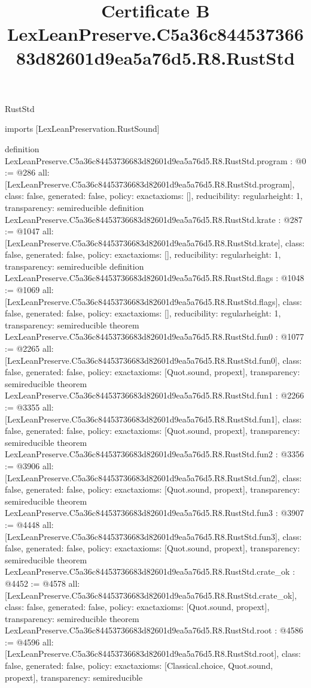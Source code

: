 \begin{lexlean}{RustStd}
\title{Certificate B LexLeanPreserve.C5a36c84453736683d82601d9ea5a76d5.R8.RustStd}
\begin{coremodule}
imports [LexLeanPreservation.RustSound]

definition LexLeanPreserve.C5a36c84453736683d82601d9ea5a76d5.R8.RustStd.program : @0 := @286 {
  all: [LexLeanPreserve.C5a36c84453736683d82601d9ea5a76d5.R8.RustStd.program],
  class: false,
  generated: false,
  policy: exact{axioms: []},
  reducibility: regular{height: 1},
  transparency: semireducible
}
definition LexLeanPreserve.C5a36c84453736683d82601d9ea5a76d5.R8.RustStd.krate : @287 := @1047 {
  all: [LexLeanPreserve.C5a36c84453736683d82601d9ea5a76d5.R8.RustStd.krate],
  class: false,
  generated: false,
  policy: exact{axioms: []},
  reducibility: regular{height: 1},
  transparency: semireducible
}
definition LexLeanPreserve.C5a36c84453736683d82601d9ea5a76d5.R8.RustStd.flags : @1048 := @1069 {
  all: [LexLeanPreserve.C5a36c84453736683d82601d9ea5a76d5.R8.RustStd.flags],
  class: false,
  generated: false,
  policy: exact{axioms: []},
  reducibility: regular{height: 1},
  transparency: semireducible
}
theorem LexLeanPreserve.C5a36c84453736683d82601d9ea5a76d5.R8.RustStd.fun0 : @1077 := @2265 {
  all: [LexLeanPreserve.C5a36c84453736683d82601d9ea5a76d5.R8.RustStd.fun0],
  class: false,
  generated: false,
  policy: exact{axioms: [Quot.sound, propext]},
  transparency: semireducible
}
theorem LexLeanPreserve.C5a36c84453736683d82601d9ea5a76d5.R8.RustStd.fun1 : @2266 := @3355 {
  all: [LexLeanPreserve.C5a36c84453736683d82601d9ea5a76d5.R8.RustStd.fun1],
  class: false,
  generated: false,
  policy: exact{axioms: [Quot.sound, propext]},
  transparency: semireducible
}
theorem LexLeanPreserve.C5a36c84453736683d82601d9ea5a76d5.R8.RustStd.fun2 : @3356 := @3906 {
  all: [LexLeanPreserve.C5a36c84453736683d82601d9ea5a76d5.R8.RustStd.fun2],
  class: false,
  generated: false,
  policy: exact{axioms: [Quot.sound, propext]},
  transparency: semireducible
}
theorem LexLeanPreserve.C5a36c84453736683d82601d9ea5a76d5.R8.RustStd.fun3 : @3907 := @4448 {
  all: [LexLeanPreserve.C5a36c84453736683d82601d9ea5a76d5.R8.RustStd.fun3],
  class: false,
  generated: false,
  policy: exact{axioms: [Quot.sound, propext]},
  transparency: semireducible
}
theorem LexLeanPreserve.C5a36c84453736683d82601d9ea5a76d5.R8.RustStd.crate_ok : @4452 := @4578 {
  all: [LexLeanPreserve.C5a36c84453736683d82601d9ea5a76d5.R8.RustStd.crate_ok],
  class: false,
  generated: false,
  policy: exact{axioms: [Quot.sound, propext]},
  transparency: semireducible
}
theorem LexLeanPreserve.C5a36c84453736683d82601d9ea5a76d5.R8.RustStd.root : @4586 := @4596 {
  all: [LexLeanPreserve.C5a36c84453736683d82601d9ea5a76d5.R8.RustStd.root],
  class: false,
  generated: false,
  policy: exact{axioms: [Classical.choice, Quot.sound, propext]},
  transparency: semireducible
}


\end{coremodule}
\end{lexlean}
